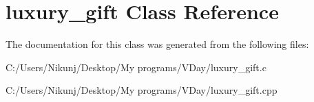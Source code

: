 \hypertarget{classluxury__gift}{}\section{luxury\+\_\+gift Class Reference}
\label{classluxury__gift}


The documentation for this class was generated from the following files\+:\begin{DoxyCompactItemize}
\item 
C\+:/\+Users/\+Nikunj/\+Desktop/\+My programs/\+V\+Day/luxury\+\_\+gift.\+c\item 
C\+:/\+Users/\+Nikunj/\+Desktop/\+My programs/\+V\+Day/luxury\+\_\+gift.\+cpp\end{DoxyCompactItemize}

